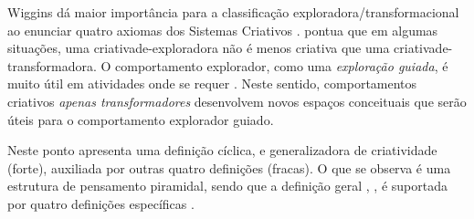  Wiggins dá maior importância para a classificação exploradora/transformacional ao enunciar quatro axiomas dos Sistemas Criativos .  pontua que em algumas situações, uma criativade-exploradora não é menos criativa que uma criativade-transformadora. O comportamento explorador, como uma \emph{exploração guiada}, é muito útil em atividades onde se requer  . Neste sentido, comportamentos criativos \emph{apenas transformadores} desenvolvem novos espaços conceituais que serão úteis para o comportamento explorador guiado. 


Neste ponto  apresenta uma definição cíclica, e generalizadora de criatividade (forte), auxiliada por outras quatro definições (fracas). O que se observa é uma estrutura de pensamento piramidal, sendo que a definição geral , , é suportada por quatro definições específicas .

